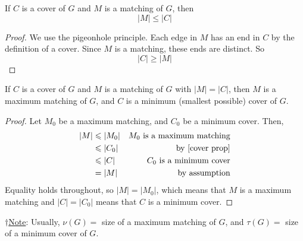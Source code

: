 \begin{thmbox}
    \begin{prop}\label{cover prop}
        If $ C $ is a cover of $ G $ and $ M $ is a matching of $ G $, then
        \[ |M|\leqslant |C| \]
    \end{prop}
\end{thmbox}
\begin{proof}
    We use the pigeonhole principle. Each edge in $ M $ has an end in $ C $ by the definition
    of a cover. Since $ M $ is a matching, these ends are distinct. So
    \[ |C|\geqslant |M| \]
\end{proof}

\begin{thmbox}
    \begin{prop}
        If $ C $ is a cover of $ G $ and $ M $ is a matching of $ G $ with $ |M|=|C| $,
        then $ M $ is a maximum matching of $ G $, and $ C $ is a minimum (smallest possible)
        cover of $ G $.
    \end{prop}
\end{thmbox}
\begin{proof}
    Let $ M_0 $ be a maximum matching, and $ C_0 $ be a minimum cover. Then,
    \begin{equation}
        \begin{aligned}
            |M| & \leqslant |M_0| & M_0\text{ is a maximum matching} \\
                & \leqslant |C_0| & \text{by \ref{cover prop}}       \\
                & \leqslant |C|   & C_0 \text{ is a minimum cover}   \\
                & =|M|            & \text{by assumption}
        \end{aligned}
    \end{equation}
    Equality holds throughout, so $ |M|=|M_0| $, which means that $ M $ is a maximum
    matching and $ |C|=|C_0| $ means that $ C $ is a minimum cover.
\end{proof}
$ \dagger $\underline{Note}: Usually, $ \nu(G) = $ size of a maximum matching of $ G $,
and $ \tau(G) = $ size of a minimum cover of $ G $.

